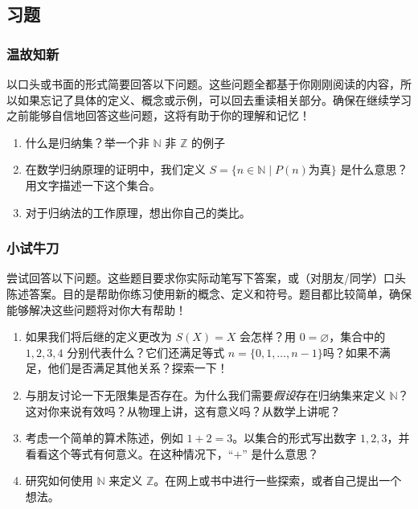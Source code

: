 \subsection{习题}

\subsubsection*{温故知新}

以口头或书面的形式简要回答以下问题。这些问题全都基于你刚刚阅读的内容，所以如果忘记了具体的定义、概念或示例，可以回去重读相关部分。确保在继续学习之前能够自信地回答这些问题，这将有助于你的理解和记忆！

\begin{enumerate}[label=(\arabic*)]
    \item 什么是归纳集？举一个非 $\mathbb{N}$ 非 $\mathbb{Z}$ 的例子
    \item 在数学归纳原理的证明中，我们定义 $S = \{n \in \mathbb{N} \mid P(n) \text{为真}\}$ 是什么意思？用文字描述一下这个集合。
    \item 对于归纳法的工作原理，想出你自己的类比。
\end{enumerate}

\subsubsection*{小试牛刀}

尝试回答以下问题。这些题目要求你实际动笔写下答案，或（对朋友/同学）口头陈述答案。目的是帮助你练习使用新的概念、定义和符号。题目都比较简单，确保能够解决这些问题将对你大有帮助！

\begin{enumerate}[label=(\arabic*)]
    \item 如果我们将后继的定义更改为 $S(X) = {X}$ 会怎样？用 $0 = \varnothing$，集合中的 $1,2,3,4$ 分别代表什么？它们还满足等式 $n = \{0, 1, \dots, n - 1\}$吗？如果不满足，他们是否满足其他关系？探索一下！
    \item 与朋友讨论一下无限集是否存在。为什么我们需要\emph{假设}存在归纳集来定义 $\mathbb{N}$？这对你来说有效吗？从物理上讲，这有意义吗？从数学上讲呢？
    \item 考虑一个简单的算术陈述，例如 $1 + 2 = 3$。以集合的形式写出数字 $1,2,3$，并看看这个等式有何意义。在这种情况下，``$+$'' 是什么意思？
    \item 研究如何使用 $\mathbb{N}$ 来定义 $\mathbb{Z}$。在网上或书中进行一些探索，或者自己提出一个想法。
\end{enumerate}